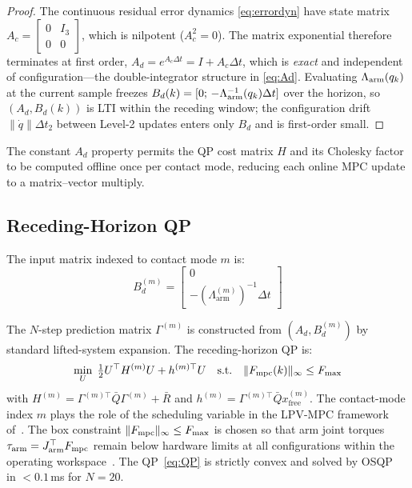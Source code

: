 \begin{proof}
The continuous residual error dynamics \eqref{eq:errordyn} have state matrix
$A_c=\left[\begin{smallmatrix}0&I_3\\0&0\end{smallmatrix}\right]$, which is
nilpotent ($A_c^2=0$). The matrix exponential therefore terminates at first
order, $A_d=e^{A_c\Delta t}=I+A_c\Delta t$, which is \emph{exact} and
independent of configuration---the double-integrator structure in
\eqref{eq:Ad}. Evaluating $\Lambda_{\text{arm}}(q_k)$ at the current sample freezes
$B_d(k)=[0;\,-\Lambda_{\text{arm}}^{-1}(q_k)\Delta t]$ over the horizon, so $(A_d,B_d(k))$ is
LTI within the receding window; the configuration drift
$\|\dot q\|\Delta t_2$ between Level-2 updates enters only $B_d$ and is
first-order small.
\end{proof}

The constant $A_d$ property permits the QP cost matrix $H$ and its Cholesky
factor to be computed offline once per contact mode, reducing each online
MPC update to a matrix--vector multiply.

\subsection{Receding-Horizon QP}

The input matrix indexed to contact mode $m$ is:
\begin{equation}\label{eq:Bd}
  B_d^{(m)} = \begin{bmatrix}0 \\ -(\Lambda_{\text{arm}}^{(m)})^{-1}\Delta t\end{bmatrix}
\end{equation}

The $N$-step prediction matrix $\Gamma^{(m)}$ is constructed from
$(A_d,B_d^{(m)})$ by standard lifted-system expansion.
The receding-horizon QP is:
\begin{equation}\label{eq:QP}
  \min_{U}\;\tfrac{1}{2}U^\top H^{(m)}U + h^{(m)\top}U
  \quad\text{s.t.}\quad \|F_{\text{mpc}}(k)\|_\infty\leq F_{\max}
\end{equation}
with $H^{(m)}=\Gamma^{(m)\top}\bar{Q}\Gamma^{(m)}+\bar{R}$ and
$h^{(m)}=\Gamma^{(m)\top}\bar{Q}x_{\text{free}}^{(m)}$.
The contact-mode index $m$ plays the role of the scheduling variable in the
LPV-MPC framework of~\cite{cao2005minmax}.
The box constraint $\|F_{\text{mpc}}\|_\infty\leq F_{\max}$ is chosen so that arm
joint torques $\tau_{\text{arm}}=J_{\text{arm}}^\top F_{\text{mpc}}$ remain below
hardware limits at all configurations within the operating
workspace~\cite{cao2002antiwindup}.
The QP~\eqref{eq:QP} is strictly convex and solved by OSQP~\cite{stellato2020osqp}
in $<0.1$\,ms for $N=20$.

